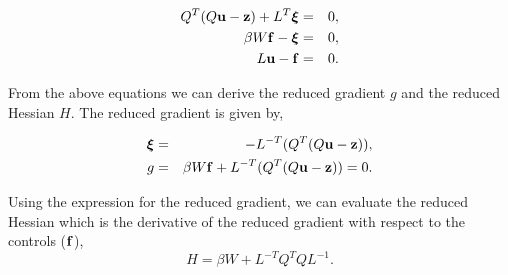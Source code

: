 \documentclass[10pt]{article}
\newenvironment{enumerateroman}{\begin{enumerate}[i.]}{\end{enumerate}}
\begin{document}
\begin{eqnarray*}
Q^T(Q\mathbf{u} - \mathbf{z}) + L^T{\boldsymbol{\xi}}&=& 0, \\
\beta W\mathbf{f} - {\boldsymbol{\xi}} &=& 0, \\
L\mathbf{u} - \mathbf{f} &=& 0. 
\end{eqnarray*}

From the above equations we can derive the reduced gradient $g$ and the reduced Hessian $H$. The reduced gradient is given by,

\begin{eqnarray}
{\boldsymbol{\xi}} &=& -L^{-T}(Q^T(Q\mathbf{u} - \mathbf{z})), \\
g &=& \beta W\mathbf{f} + L^{-T}(Q^T(Q\mathbf{u} - \mathbf{z})) = 0. 
\end{eqnarray}


Using the expression for the reduced gradient, we can evaluate the reduced Hessian which is the derivative of the reduced gradient with respect to the controls ($\mathbf{f}$),
\begin{equation}
H = \beta W + L^{-T}Q^TQL^{-1}.
\end{equation}
 
%
%  
%  
%  
\end{document}
